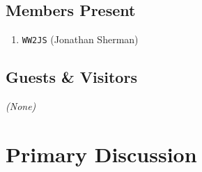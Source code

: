 \documentclass[10pt,letterpaper]{article}
\begin{document}
\subsection{Members Present}
\begin{enumerate}
  \item \texttt{WW2JS} (Jonathan Sherman)
\end{enumerate}

\subsection{Guests \& Visitors}
\emph{(None)}

\section{Primary Discussion}
\end{document}
